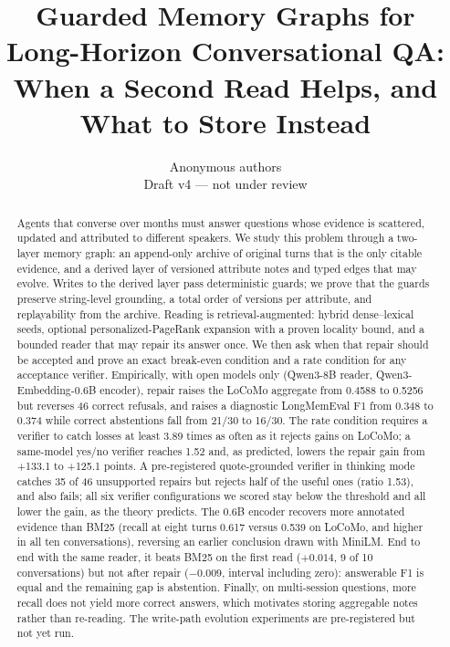 \documentclass[10pt]{article}
\title{\textbf{Guarded Memory Graphs for Long-Horizon Conversational QA:\\
When a Second Read Helps, and What to Store Instead}}
\author{Anonymous authors\\ \small Draft v4 --- not under review}
\date{}
\theoremstyle{plain}
\theoremstyle{definition}
\theoremstyle{remark}
\begin{document}
\maketitle

\begin{abstract}
Agents that converse over months must answer questions whose evidence is
scattered, updated and attributed to different speakers. We study this problem
through a two-layer memory graph: an append-only archive of original turns that
is the only citable evidence, and a derived layer of versioned attribute notes
and typed edges that may evolve. Writes to the derived layer pass deterministic
guards; we prove that the guards preserve string-level grounding, a total order
of versions per attribute, and replayability from the archive. Reading is
retrieval-augmented: hybrid dense--lexical seeds, optional personalized-PageRank
expansion with a proven locality bound, and a bounded reader that may repair its
answer once. We then ask when that repair should be accepted and prove an exact
break-even condition and a rate condition for any acceptance verifier. Empirically,
with open models only (Qwen3-8B reader, Qwen3-Embedding-0.6B encoder), repair raises
the LoCoMo aggregate from 0.4588 to 0.5256 but reverses 46 correct refusals, and
raises a diagnostic LongMemEval F1 from 0.348 to 0.374 while correct abstentions
fall from 21/30 to 16/30. The rate condition requires a verifier to catch losses at
least 3.89 times as often as it rejects gains on LoCoMo; a same-model yes/no
verifier reaches 1.52 and, as predicted, lowers the repair gain from +133.1 to
+125.1 points. A pre-registered quote-grounded verifier in thinking mode catches
35 of 46 unsupported repairs but rejects half of the useful ones (ratio 1.53), and
also fails; all six verifier configurations we scored stay below the threshold and
all lower the gain, as the theory predicts. The 0.6B encoder recovers more annotated evidence than BM25
(recall at eight turns 0.617 versus 0.539 on LoCoMo, and higher in all ten
conversations), reversing an earlier conclusion drawn with MiniLM. End to end with
the same reader, it beats BM25 on the first read ($+0.014$, 9 of 10 conversations)
but not after repair ($-0.009$, interval including zero): answerable F1 is equal and
the remaining gap is abstention. Finally, on
multi-session questions, more recall does not yield more correct answers, which
motivates storing aggregable notes rather than re-reading. The write-path
evolution experiments are pre-registered but not yet run.
\end{abstract}
\end{document}
